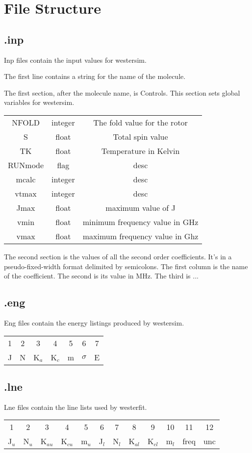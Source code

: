 \documentclass{article}
\begin{document}
	
\section{File Structure}

\subsection{.inp}

Inp files contain the input values for westersim.

The first line contains a string for the name of the molecule.

The first section, after the molecule name, is Controls. This section sets global variables for westersim.

\begin{tabular}{c c c}
	NFOLD & integer & The fold value for the rotor \\
	S & float & Total spin value \\
	TK & float & Temperature in Kelvin \\
	RUNmode & flag & desc \\
	mcalc & integer & desc \\
	vtmax & integer & desc \\
	Jmax & float & maximum value of J \\
	vmin & float & minimum frequency value in GHz \\
	vmax & float & maximum frequency value in Ghz \\
\end{tabular}

The second section is the values of all the second order coefficients. It's in a pseudo-fixed-width format delimited by semicolons. The first column is the name of the coefficient. The second is its value in MHz. The third is ...



\subsection{.eng}
	
Eng files contain the energy listings produced by westersim.
	
	\begin{tabular}{c c c c c c c}
		1 & 2 & 3 & 4 & 5 & 6 & 7 \\
		J & N & K$_a$ & K$_c$ & m & $\sigma$ & E \\
	\end{tabular}
	
\subsection{.lne}

Lne files contain the line lists used by westerfit.


	\begin{tabular}{c c c c c c c c c c c c}
		1 & 2 & 3 & 4 & 5 & 6 & 7 & 8 & 9 & 10 & 11 & 12 \\
		J$_u$ & N$_u$ & K$_{au}$ & K$_{cu}$ & m$_u$ & J$_l$ & N$_l$ & K$_{al}$ & K$_{cl}$ & m$_l$ & freq & unc \\
	\end{tabular}
		
	
\end{document}
